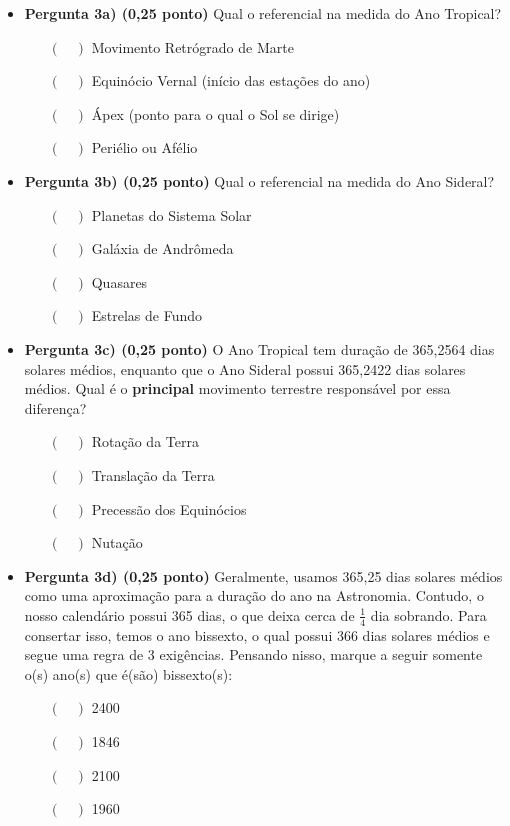\documentclass[a4paper, 12pt]{article}
\begin{document}
\begin{flushleft}
\begin{itemize}
			\begin{itemize}
				\item \textbf{Pergunta 3a) (0,25 ponto)} Qual o referencial na medida do Ano Tropical?
					\begin{itemize}
						\item[$(\quad)$] Movimento Retrógrado de Marte
						\item[$(\quad)$] Equinócio Vernal (início das estações do ano)
						\item[$(\quad)$] Ápex (ponto para o qual o Sol se dirige)
						\item[$(\quad)$] Periélio ou Afélio
					\end{itemize}
				\item \textbf{Pergunta 3b) (0,25 ponto)} Qual o referencial na medida do Ano Sideral?
					\begin{itemize}
						\item[$(\quad)$] Planetas do Sistema Solar
						\item[$(\quad)$] Galáxia de Andrômeda
						\item[$(\quad)$] Quasares
						\item[$(\quad)$] Estrelas de Fundo
					\end{itemize}
				\item \textbf{Pergunta 3c) (0,25 ponto)} O Ano Tropical tem duração de 365,2564 dias solares médios, enquanto que o Ano Sideral possui 365,2422 dias solares médios. Qual é o \textbf{principal} movimento terrestre responsável por essa diferença?
					\begin{itemize}
						\item[$(\quad)$] Rotação da Terra
						\item[$(\quad)$] Translação da Terra
						\item[$(\quad)$] Precessão dos Equinócios
						\item[$(\quad)$] Nutação
					\end{itemize}
				\item \textbf{Pergunta 3d) (0,25 ponto)} Geralmente, usamos 365,25 dias solares médios como uma aproximação para a duração do ano na Astronomia. Contudo, o nosso calendário possui 365 dias, o que deixa cerca de $\frac{1}{4}$ dia sobrando. Para consertar isso, temos o ano bissexto, o qual possui 366 dias solares médios e segue uma regra de 3 exigências. Pensando nisso, marque a seguir somente o(s) ano(s) que é(são) bissexto(s):
					\begin{itemize}
						\item[$(\quad)$] 2400
						\item[$(\quad)$] 1846
						\item[$(\quad)$] 2100
						\item[$(\quad)$] 1960
					\end{itemize}
			\end{itemize}
		

\end{itemize}
\end{flushleft}
\end{document}
